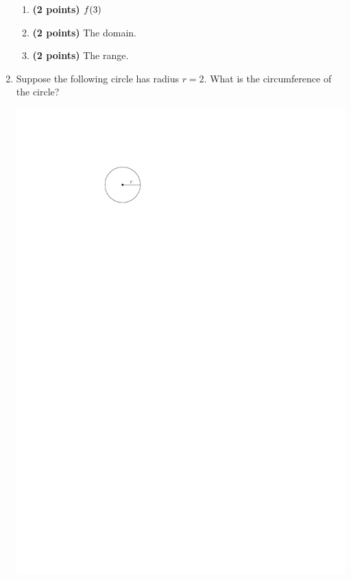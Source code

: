 \documentclass[12pt]{amsart}
\begin{document}
\begin{enumerate}
 \begin{enumerate}

\item {\bf (2 points)} $f(3)$ \vspace{2cm}

\item {\bf (2 points)} The domain. \vspace{2cm}

\item {\bf (2 points)} The range. \vspace{2cm}

\end{enumerate}


\def \radi{2}\def \circumf{4}

 
\item Suppose the following circle has radius $r= \radi$. What is the circumference of the circle?
\vspace{2mm}

\includegraphics[scale = 0.8]{circle}

\vspace{1cm}
\newpage  $ $   \newpage\end{enumerate}\graphicspath{{/Users/jilan/Downloads/Randomizer/Randomizer/Sample Course/Sample Assessment/}}\setcounter{page}{1}
\end{document}
